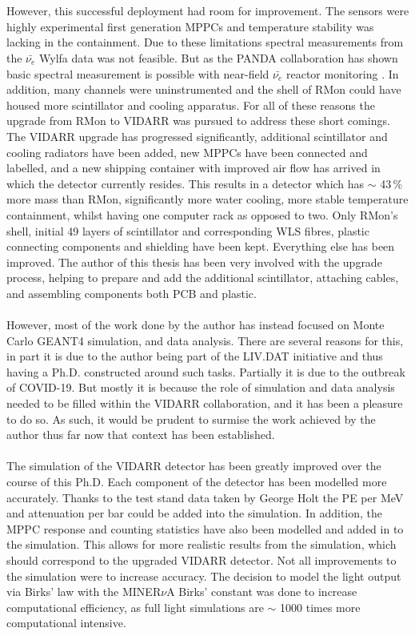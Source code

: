 \\\\However, this successful deployment had room for improvement. The sensors were highly experimental first generation MPPCs and temperature stability was lacking in the containment. Due to these limitations spectral measurements from the $\bar{\nu_e}$ Wylfa data was not feasible. But as the PANDA collaboration has shown basic spectral measurement is possible with near-field $\bar{\nu_e}$ reactor monitoring \cite{IIRIE_Panda_2021}. In addition, many channels were uninstrumented and the shell of RMon could have housed more scintillator and cooling apparatus. For all of these reasons the upgrade from RMon to VIDARR was pursued to address these short comings. The VIDARR upgrade has progressed significantly, additional scintillator and cooling radiators have been added, new MPPCs have been connected and labelled, and a new shipping container with improved air flow has arrived in which the detector currently resides. This results in a detector which has $\sim$ 43\,\% more mass than RMon, significantly more water cooling, more stable temperature containment, whilst having one computer rack as opposed to two. Only RMon's shell, initial 49 layers of scintillator and corresponding WLS fibres, plastic connecting components and shielding have been kept. Everything else has been improved. The author of this thesis has been very involved with the upgrade process, helping to prepare and add the additional scintillator, attaching cables, and assembling components both PCB and plastic. 
\\\\However, most of the work done by the author has instead focused on Monte Carlo GEANT4 \cite{Agostinelli:2002hh} simulation, and data analysis. There are several reasons for this, in part it is due to the author being part of the LIV.DAT initiative and thus having a Ph.D. constructed around such tasks. Partially it is due to the outbreak of COVID-19. But mostly it is because the role of simulation and data analysis needed to be filled within the VIDARR collaboration, and it has been a pleasure to do so. As such, it would be prudent to surmise the work achieved by the author thus far now that context has been established. 
\\\\The simulation of the VIDARR detector has been greatly improved over the course of this Ph.D. Each component of the detector has been modelled more accurately. Thanks to the test stand data taken by George Holt the PE per MeV and attenuation per bar could be added into the simulation. In addition, the MPPC response and counting statistics have also been modelled and added in to the simulation. This allows for more realistic results from the simulation, which should correspond to the upgraded VIDARR detector. Not all improvements to the simulation were to increase accuracy. The decision to model the light output via Birks' law with the MINER$\nu$A Birks' constant was done to increase computational efficiency, as full light simulations are $\sim$ 1000 times more computational intensive. 
